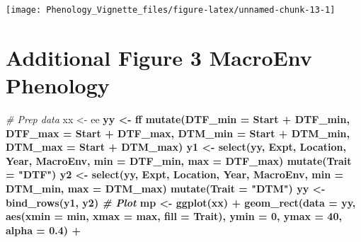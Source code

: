 \documentclass[
]{article}
\newenvironment{Shaded}{\begin{snugshade}}{\end{snugshade}}
\newcommand{\CommentTok}[1]{\textcolor[rgb]{0.56,0.35,0.01}{\textit{#1}}}
\newcommand{\DataTypeTok}[1]{\textcolor[rgb]{0.13,0.29,0.53}{#1}}
\newcommand{\DecValTok}[1]{\textcolor[rgb]{0.00,0.00,0.81}{#1}}
\newcommand{\FloatTok}[1]{\textcolor[rgb]{0.00,0.00,0.81}{#1}}
\newcommand{\KeywordTok}[1]{\textcolor[rgb]{0.13,0.29,0.53}{\textbf{#1}}}
\newcommand{\NormalTok}[1]{#1}
\newcommand{\OperatorTok}[1]{\textcolor[rgb]{0.81,0.36,0.00}{\textbf{#1}}}
\newcommand{\StringTok}[1]{\textcolor[rgb]{0.31,0.60,0.02}{#1}}
\begin{document}
\texttt{[image: Phenology\_Vignette\_files/figure-latex/unnamed-chunk-13-1]}

\hypertarget{additional-figure-3-macroenv-phenology}{%
\section{Additional Figure 3 MacroEnv
Phenology}\label{additional-figure-3-macroenv-phenology}}

\begin{Shaded}
\begin{Highlighting}[]
\CommentTok{# Prep data}
\NormalTok{xx <-}\StringTok{ }\NormalTok{ee }\OperatorTok{%
\NormalTok{yy <-}\StringTok{ }\NormalTok{ff }\OperatorTok{%
\StringTok{  }\KeywordTok{mutate}\NormalTok{(}\DataTypeTok{DTF_min =}\NormalTok{ Start }\OperatorTok{+}\StringTok{ }\NormalTok{DTF_min, }\DataTypeTok{DTF_max =}\NormalTok{ Start }\OperatorTok{+}\StringTok{ }\NormalTok{DTF_max,}
         \DataTypeTok{DTM_min =}\NormalTok{ Start }\OperatorTok{+}\StringTok{ }\NormalTok{DTM_min, }\DataTypeTok{DTM_max =}\NormalTok{ Start }\OperatorTok{+}\StringTok{ }\NormalTok{DTM_max)}
\NormalTok{y1 <-}\StringTok{ }\KeywordTok{select}\NormalTok{(yy, Expt, Location, Year, MacroEnv, }\DataTypeTok{min =}\NormalTok{ DTF_min, }\DataTypeTok{max =}\NormalTok{ DTF_max) }\OperatorTok{%
\StringTok{  }\KeywordTok{mutate}\NormalTok{(}\DataTypeTok{Trait =} \StringTok{"DTF"}\NormalTok{)}
\NormalTok{y2 <-}\StringTok{ }\KeywordTok{select}\NormalTok{(yy, Expt, Location, Year, MacroEnv, }\DataTypeTok{min =}\NormalTok{ DTM_min, }\DataTypeTok{max =}\NormalTok{ DTM_max) }\OperatorTok{%
\StringTok{  }\KeywordTok{mutate}\NormalTok{(}\DataTypeTok{Trait =} \StringTok{"DTM"}\NormalTok{)}
\NormalTok{yy <-}\StringTok{ }\KeywordTok{bind_rows}\NormalTok{(y1, y2)}
\CommentTok{# Plot}
\NormalTok{mp <-}\StringTok{ }\KeywordTok{ggplot}\NormalTok{(xx) }\OperatorTok{+}
\StringTok{  }\KeywordTok{geom_rect}\NormalTok{(}\DataTypeTok{data =}\NormalTok{ yy, }\KeywordTok{aes}\NormalTok{(}\DataTypeTok{xmin =}\NormalTok{ min, }\DataTypeTok{xmax =}\NormalTok{ max, }\DataTypeTok{fill =}\NormalTok{ Trait), }
            \DataTypeTok{ymin =} \DecValTok{0}\NormalTok{, }\DataTypeTok{ymax =} \DecValTok{40}\NormalTok{, }\DataTypeTok{alpha =} \FloatTok{0.4}\NormalTok{) }\OperatorTok{+}
}}}}
\end{Highlighting}
\end{Shaded}
\end{document}
